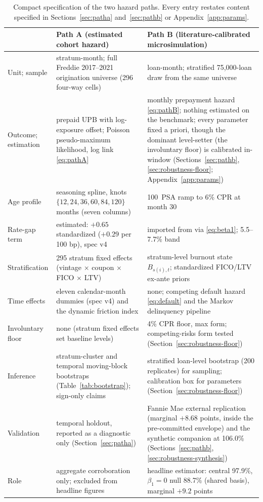\documentclass[12pt]{article}
\begin{document}
\begin{table}[H]
\centering
\caption{Compact specification of the two hazard paths. Every entry restates
content specified in Sections~\ref{sec:patha} and~\ref{sec:pathb} or
Appendix~\ref{app:params}.}
\label{tab:specbox}
\footnotesize
\begin{threeparttable}
\begin{tabular}{@{}p{2.2cm}p{5.9cm}p{5.9cm}@{}}
\toprule
 & Path A (estimated cohort hazard) & Path B (literature-calibrated microsimulation) \\
\midrule
Unit; sample & stratum-month; full Freddie 2017--2021 origination universe (296 four-way cells) & loan-month; stratified 75{,}000-loan draw from the same universe \\
Outcome; estimation & prepaid UPB with log-exposure offset; Poisson pseudo-maximum likelihood, log link \eqref{eq:pathA} & monthly prepayment hazard \eqref{eq:pathB}; nothing estimated on the benchmark; every parameter fixed a priori, though the dominant level-setter (the involuntary floor) is calibrated in-window (Sections~\ref{sec:pathb}, \ref{sec:robustness-floor}; Appendix~\ref{app:params}) \\
Age profile & seasoning spline, knots $\{12,24,36,60,84,120\}$ months (seven columns) & 100~PSA ramp to 6\% CPR at month 30 \\
Rate-gap term & estimated: $+0.65$ standardized ($+0.29$ per 100 bp), spec v4 & imported from \citet{liebersohn2024} via \eqref{eq:beta1}; 5.5--7.7\% band \\
Stratification & 295 stratum fixed effects (vintage $\times$ coupon $\times$ FICO $\times$ LTV) & stratum-level burnout state $B_{s(i),t}$; standardized FICO/LTV ex-ante priors \\
Time effects & eleven calendar-month dummies (spec v4) and the dynamic friction index & none; competing default hazard \eqref{eq:default} and the Markov delinquency pipeline \\
Involuntary floor & none (stratum fixed effects set baseline levels) & 4\% CPR floor, max form; competing-risks form tested (Section~\ref{sec:robustness-floor}) \\
Inference & stratum-cluster and temporal moving-block bootstraps (Table~\ref{tab:bootstrap}); sign-only claims & stratified loan-level bootstrap (200 replicates) for sampling; calibration box for parameters (Section~\ref{sec:robustness-floor}) \\
Validation & temporal holdout, reported as a diagnostic only (Section~\ref{sec:patha}) & Fannie Mae external replication (marginal $+8.68$ points, inside the pre-committed envelope) and the synthetic companion at 106.0\% (Sections~\ref{sec:pathb}, \ref{sec:robustness-synthesis}) \\
Role & aggregate corroboration only; excluded from headline figures & headline estimator: central 97.9\%, $\beta_1 = 0$ null 88.7\% (shared basis), marginal $+9.2$ points \\
\bottomrule
\end{tabular}
\end{threeparttable}
\end{table}
\end{document}
